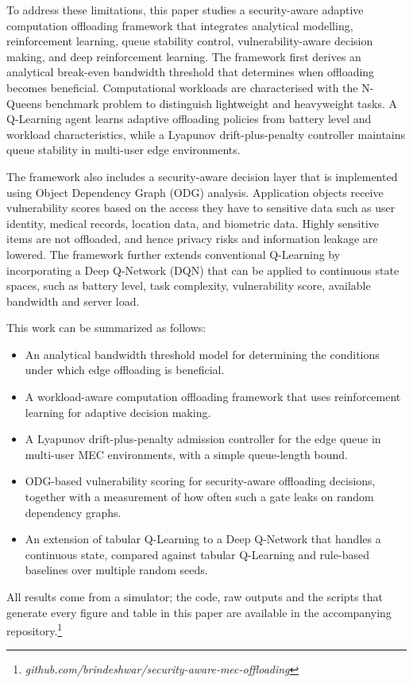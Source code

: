 \documentclass{ieeeaccess}
\begin{document}
To address these limitations, this paper studies a security-aware adaptive computation offloading framework that integrates analytical modelling, reinforcement learning, queue stability control, vulnerability-aware decision making, and deep reinforcement learning. The framework first derives an analytical break-even bandwidth threshold that determines when offloading becomes beneficial. Computational workloads are characterised with the N-Queens benchmark problem to distinguish lightweight and heavyweight tasks. A Q-Learning agent learns adaptive offloading policies from battery level and workload characteristics, while a Lyapunov drift-plus-penalty controller maintains queue stability in multi-user edge environments.

The framework also includes a security-aware decision layer that is implemented using Object Dependency Graph (ODG) analysis. Application objects receive vulnerability scores based on the access they have to sensitive data such as user identity, medical records, location data, and biometric data. Highly sensitive items are not offloaded, and hence privacy risks and information leakage are lowered. The framework further extends conventional Q-Learning by incorporating a Deep Q-Network (DQN) that can be applied to continuous state spaces, such as battery level, task complexity, vulnerability score, available bandwidth and server load.

This work can be summarized as follows:
\begin{itemize}
\item An analytical bandwidth threshold model for determining the conditions under which edge offloading is beneficial.
\item A workload-aware computation offloading framework that uses reinforcement learning for adaptive decision making.
\item A Lyapunov drift-plus-penalty admission controller for the edge queue in multi-user MEC environments, with a simple queue-length bound.
\item ODG-based vulnerability scoring for security-aware offloading decisions, together with a measurement of how often such a gate leaks on random dependency graphs.
\item An extension of tabular Q-Learning to a Deep Q-Network that handles a continuous state, compared against tabular Q-Learning and rule-based baselines over multiple random seeds.
\end{itemize}
All results come from a simulator; the code, raw outputs and the scripts that generate every figure and table in this paper are available in the accompanying repository.\footnote{\textit{github.com/brindeshwar/security-aware-mec-offloading}}
\end{document}
